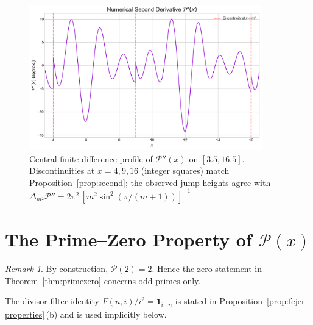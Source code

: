 \documentclass[11pt,a4paper]{amsart}
\theoremstyle{plain}
\theoremstyle{definition}
\theoremstyle{remark}
\newtheorem{remark}[theorem]{Remark}
\begin{document}
\begin{figure}[!htbp]
\centering
\includegraphics[width=0.9\textwidth]{plot_second_derivative.pdf}
\caption{Central finite-difference profile of $\mathcal{P}''(x)$ on $[3.5,16.5]$. Discontinuities at $x=4,9,16$ (integer squares) match Proposition~\ref{prop:second}; the observed jump heights agree with $\Delta_{m^2}\mathcal P''=2\pi^2\,[m^2\sin^2(\pi/(m+1))]^{-1}$.}
\label{fig:secondderivative}
\end{figure}

\FloatBarrier

\section{The Prime–Zero Property of $\mathcal{P}(x)$}

\begin{remark}
By construction, $\mathcal P(2)=2$. Hence the zero statement in Theorem~\ref{thm:primezero} concerns odd primes only.
\end{remark}

\noindent The divisor-filter identity $F(n,i)/i^2=\mathbf{1}_{i\mid n}$ is stated in Proposition~\ref{prop:fejer-properties}\,(b) and is used implicitly below.
\end{document}
